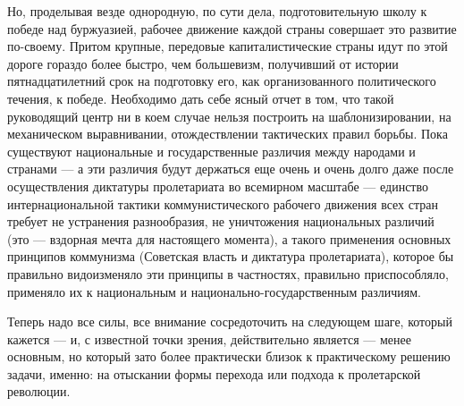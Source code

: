 \documentclass[12pt]{article}
\newcommand{\parnum}{(\arabic{parcount})}
\newcounter{parcount}
\newenvironment{parnumbers}{%
  \par%
  \everypar{\noindent \stepcounter{parcount}\marginpar[]{\parnum}}%
}{}
\begin{document}
\begin{parnumbers}
Но, проделывая везде однородную, по сути дела, подготовительную школу к победе над буржуазией, рабочее движение каждой страны совершает это развитие по-своему. Притом крупные, передовые капиталистические страны идут по этой дороге гораздо более быстро, чем большевизм, получивший от истории пятнадцатилетний срок на подготовку его, как организованного политического течения, к победе. Необходимо дать себе ясный отчет в том, что такой руководящий центр ни в коем случае нельзя построить на шаблонизировании, на механическом выравнивании, отождествлении тактических правил борьбы. Пока существуют национальные и государственные различия между народами и странами — а эти различия будут держаться еще очень и очень долго даже после осуществления диктатуры пролетариата во всемирном масштабе — единство интернациональной тактики коммунистического рабочего движения всех стран требует не устранения разнообразия, не уничтожения национальных различий (это — вздорная мечта для настоящего момента), а такого применения основных принципов коммунизма (Советская власть и диктатура пролетариата), которое бы правильно видоизменяло эти принципы в частностях, правильно приспособляло, применяло их к национальным и национально-государственным различиям.

Теперь надо все силы, все внимание сосредоточить на следующем шаге, который кажется — и, с известной точки зрения, действительно является — менее основным, но который зато более практически близок к практическому решению задачи, именно: на отыскании формы перехода или подхода к пролетарской революции.


\end{parnumbers}
\end{document}
